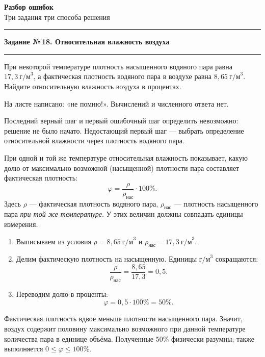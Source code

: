 \documentclass[a4paper,11pt]{article}
\newcommand{\themelabel}[1]{\par\vspace{0.20em}\noindent{\bfseries\textcolor{darkaccent}{#1}}\par\vspace{-0.42em}}
\newcommand{\errorlabel}[1]{\par\vspace{0.20em}\noindent{\bfseries\textcolor{error}{#1}}\par\vspace{-0.42em}}
\newcommand{\tasktitle}[2]{\phantomsection\label{task:#1}{\Large\bfseries\textcolor{darkaccent}{Задание №\,#1. #2}}\par\medskip\noindent\textcolor{accent}{\rule{\linewidth}{0.7pt}}\par\medskip}
\begin{document}
\thispagestyle{fancy}
\vspace*{0.33\textheight}
\begin{center}
{\Huge\bfseries\textcolor{darkaccent}{Разбор ошибок}}\\[10mm]
{\large\textcolor{softgray}{Три задания \;\textbullet\; три способа решения}}\\[12mm]
\textcolor{accent}{\rule{0.62\linewidth}{0.7pt}}
\end{center}
\clearpage

\tasktitle{18}{Относительная влажность воздуха}
\themelabel{Текст задания}
При некоторой температуре плотность насыщенного водяного пара равна $17{,}3\ \text{г/м}^3$, а фактическая плотность водяного пара в воздухе равна $8{,}65\ \text{г/м}^3$. Найдите относительную влажность воздуха в процентах.

\themelabel{Ваше решение и ответ}
На листе написано: «не помню!». Вычислений и численного ответа нет.

\errorlabel{Что осталось невыполненным}
Последний верный шаг и первый ошибочный шаг определить невозможно: решение не было начато. Недостающий первый шаг --- выбрать определение относительной влажности через плотность водяного пара.

\themelabel{Ключевая идея}
При одной и той же температуре относительная влажность показывает, какую долю от максимально возможной (насыщенной) плотности пара составляет фактическая плотность:
\[
\boxed{\varphi=\frac{\rho}{\rho_{\text{нас}}}\cdot100\%.}
\]
Здесь $\rho$ --- фактическая плотность водяного пара, $\rho_{\text{нас}}$ --- плотность насыщенного пара \emph{при той же температуре}. У этих величин должны совпадать единицы измерения.

\themelabel{Полное правильное решение}
\begin{enumerate}[leftmargin=*,itemsep=0.16em]
\item Выписываем из условия $\rho=8{,}65\ \text{г/м}^3$ и $\rho_{\text{нас}}=17{,}3\ \text{г/м}^3$.
\item Делим фактическую плотность на насыщенную. Единицы $\text{г/м}^3$ сокращаются:
\[
\frac{\rho}{\rho_{\text{нас}}}=\frac{8{,}65}{17{,}3}=0{,}5.
\]
\item Переводим долю в проценты:
\[
\varphi=0{,}5\cdot100\%=50\%.
\]
\end{enumerate}

\themelabel{Проверка}
Фактическая плотность вдвое меньше плотности насыщенного пара. Значит, воздух содержит половину максимально возможного при данной температуре количества пара в единице объёма. Полученные $50\%$ физически разумны; также выполняется $0\leqslant\varphi\leqslant100\%$.
\end{document}
